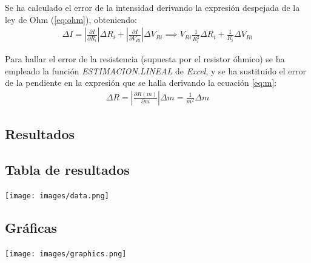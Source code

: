 \documentclass[fleqn,usenatbib,openbib]{mnras}
\begin{document}
\begin{center}
\end{center}

Se ha calculado el error de la intensidad derivando la expresión despejada de la ley de Ohm (\ref{eq:ohm}), obteniendo:
\begin{gather}
    \Delta I = \left|\frac{\partial I}{\partial R_i}\right|\Delta R_i + \left|\frac{\partial I}{\partial V_{Ri}}\right|\Delta V_{Ri} \implies V_{Ri}\frac{1}{R_i^2}\Delta R_i + \frac{1}{R_i}\Delta V_{Ri}
\end{gather}

Para hallar el error de la resistencia (supuesta por el resistor óhmico) se ha empleado la función \textit{ESTIMACION.LINEAL} de \textit{Excel}, y se ha sustituido el error de la pendiente en la expresión que se halla derivando la ecuación \ref{eq:m}:
\begin{gather}
    \Delta R = \left|\frac{\partial R(m)}{\partial m}\right| \Delta m = \frac{1}{m^2}\Delta m \label{eq:mErr}
\end{gather}


\begin{strip}
\section{Resultados}

\subsection{Tabla de resultados}

    {\centering
    \texttt{[image: images/data.png]}
    \label{tab:data}
    }

\end{strip}

\begin{strip}
\subsection{Gráficas}
\label{graphics}

    {\centering
    \texttt{[image: images/graphics.png]}
    \label{fig:graphics}
    }

\end{strip}
\end{document}
